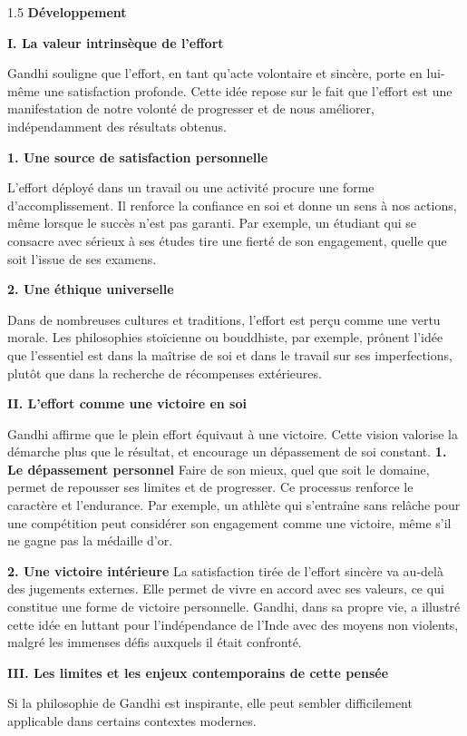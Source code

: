 \documentclass[12pt]{article}
\begin{document}
\begin{spacing}{1.5}
\textbf{Développement}

\textbf{I. La valeur intrinsèque de l'effort}

Gandhi souligne que l'effort, en tant qu'acte volontaire et sincère, porte en lui-même une satisfaction profonde. Cette idée repose sur le fait que l'effort est une manifestation de notre volonté de progresser et de nous améliorer, indépendamment des résultats obtenus.  

\textbf{1. Une source de satisfaction personnelle} 
 
   L'effort déployé dans un travail ou une activité procure une forme d'accomplissement. Il renforce la confiance en soi et donne un sens à nos actions, même lorsque le succès n'est pas garanti. Par exemple, un étudiant qui se consacre avec sérieux à ses études tire une fierté de son engagement, quelle que soit l'issue de ses examens.  
   
\textbf{2. Une éthique universelle 
   }
   
   Dans de nombreuses cultures et traditions, l'effort est perçu comme une vertu morale. Les philosophies stoïcienne ou bouddhiste, par exemple, prônent l'idée que l'essentiel est dans la maîtrise de soi et dans le travail sur ses imperfections, plutôt que dans la recherche de récompenses extérieures.

\textbf{II. L'effort comme une victoire en soi}

Gandhi affirme que le plein effort équivaut à une victoire. Cette vision valorise la démarche plus que le résultat, et encourage un dépassement de soi constant.  
\textbf{1. Le dépassement personnel
}
   Faire de son mieux, quel que soit le domaine, permet de repousser ses limites et de progresser. Ce processus renforce le caractère et l'endurance. Par exemple, un athlète qui s'entraîne sans relâche pour une compétition peut considérer son engagement comme une victoire, même s'il ne gagne pas la médaille d'or. 
    
\textbf{2. Une victoire intérieure}
   La satisfaction tirée de l'effort sincère va au-delà des jugements externes. Elle permet de vivre en accord avec ses valeurs, ce qui constitue une forme de victoire personnelle. Gandhi, dans sa propre vie, a illustré cette idée en luttant pour l'indépendance de l'Inde avec des moyens non violents, malgré les immenses défis auxquels il était confronté.

\textbf{III. Les limites et les enjeux contemporains de cette pensée}

Si la philosophie de Gandhi est inspirante, elle peut sembler difficilement applicable dans certains contextes modernes.
 

\end{spacing}
\end{document}
